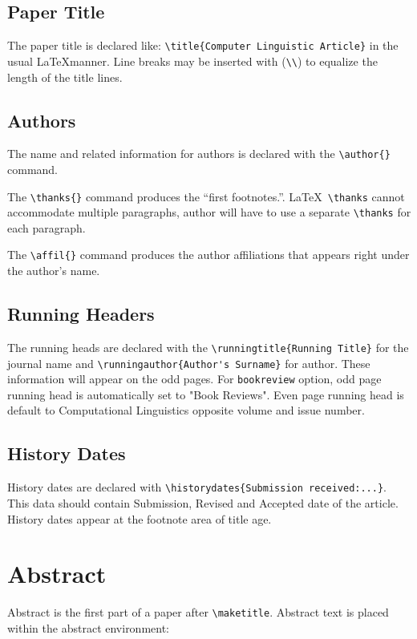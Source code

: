 \documentclass[manuscript]{clv3}
\begin{document}
\subsection{Paper Title}

The paper title is declared like: \verb|\title{Computer Linguistic Article}|
in the usual \LaTeX manner. Line breaks may be inserted with (\verb|\\|) to equalize 
the length of the title lines.

\subsection{Authors}
The name and related information for authors is declared with the \verb|\author{}| command. 

The \verb|\thanks{}| command produces the ``first footnotes.''. \LaTeX\ \verb|\thanks| 
cannot accommodate multiple paragraphs, author will have to use a separate \verb|\thanks|
for each paragraph.

The \verb|\affil{}| command produces the author affiliations that appears right under 
the author's name.

\subsection{Running Headers}
The running heads are declared with the \verb|\runningtitle{Running Title}| for the 
journal name and \verb|\runningauthor{Author's Surname}| for author. These information 
will appear on the odd pages. For {\tt bookreview} option, odd page running head is 
automatically set to "Book Reviews". Even page running head is default to Computational 
Linguistics opposite volume and issue number.

\subsection{History Dates}

History dates are declared with \verb|\historydates{Submission received:...}|. This data
should contain Submission, Revised and Accepted date of the article. History dates appear
at the footnote area of title age.


\section{Abstract}

Abstract is the first part of a paper after \verb|\maketitle|. Abstract text is 
placed within the abstract environment:
\end{document}
